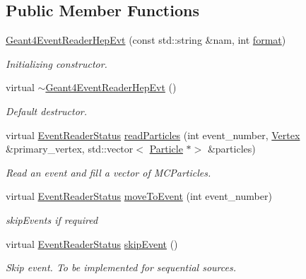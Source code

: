 \subsection*{Public Member Functions}
\begin{DoxyCompactItemize}
\item 
\hyperlink{class_d_d4hep_1_1_simulation_1_1_geant4_event_reader_hep_evt_a574587ff2aba3dc97af5e2e4c63d777c}{Geant4\+Event\+Reader\+Hep\+Evt} (const std\+::string \&nam, int \hyperlink{namespace_d_d4hep_a643d67cdbd95090fbcc93cdd3e4a8ad8}{format})
\begin{DoxyCompactList}\small\item\em Initializing constructor. \end{DoxyCompactList}\item 
virtual \hyperlink{class_d_d4hep_1_1_simulation_1_1_geant4_event_reader_hep_evt_a76273635b29ccc9d9977327da6d6d32d}{$\sim$\+Geant4\+Event\+Reader\+Hep\+Evt} ()
\begin{DoxyCompactList}\small\item\em Default destructor. \end{DoxyCompactList}\item 
virtual \hyperlink{class_d_d4hep_1_1_simulation_1_1_geant4_event_reader_ae4f4bc83ffcf5b0c1868ad78859851e7}{Event\+Reader\+Status} \hyperlink{class_d_d4hep_1_1_simulation_1_1_geant4_event_reader_hep_evt_a936bde758e79dbb3c1e053a27261ad3b}{read\+Particles} (int event\+\_\+number, \hyperlink{class_d_d4hep_1_1_simulation_1_1_geant4_event_reader_ac9738208fe520e5aa2ad1efa13de82e7}{Vertex} \&primary\+\_\+vertex, std\+::vector$<$ \hyperlink{class_d_d4hep_1_1_simulation_1_1_geant4_event_reader_ad37f7aa722da2299517d66b4568a6a4a}{Particle} $\ast$$>$ \&particles)
\begin{DoxyCompactList}\small\item\em Read an event and fill a vector of M\+C\+Particles. \end{DoxyCompactList}\item 
virtual \hyperlink{class_d_d4hep_1_1_simulation_1_1_geant4_event_reader_ae4f4bc83ffcf5b0c1868ad78859851e7}{Event\+Reader\+Status} \hyperlink{class_d_d4hep_1_1_simulation_1_1_geant4_event_reader_hep_evt_a9e8bf8ad3882ab62d481c6020b9adaed}{move\+To\+Event} (int event\+\_\+number)
\begin{DoxyCompactList}\small\item\em skip\+Events if required \end{DoxyCompactList}\item 
virtual \hyperlink{class_d_d4hep_1_1_simulation_1_1_geant4_event_reader_ae4f4bc83ffcf5b0c1868ad78859851e7}{Event\+Reader\+Status} \hyperlink{class_d_d4hep_1_1_simulation_1_1_geant4_event_reader_hep_evt_a643c4f3e44964b0a5692b5b169ada9e6}{skip\+Event} ()
\begin{DoxyCompactList}\small\item\em Skip event. To be implemented for sequential sources. \end{DoxyCompactList}\end{DoxyCompactItemize}

